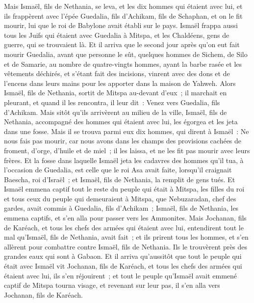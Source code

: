 \begin{multicols}{2}
Mais Ismaël, fils de Nethania, se leva, et les dix hommes qui étaient avec lui, et ils frappèrent avec l'épée Guedalia, fils d'Achikam, fils de Schaphan, et on le fit mourir, lui que le roi de Babylone avait établi sur le pays.
Ismaël frappa aussi tous les Juifs qui étaient avec Guedalia à Mitspa, et les Chaldéens, gens de guerre, qui se trouvaient là.
Et il arriva que le second jour après qu'on eut fait mourir Guedalia, avant que personne le sût,
quelques hommes de Sichem, de Silo et de Samarie, au nombre de quatre-vingts hommes, ayant la barbe rasée et les vêtements déchirés, et s'étant fait des incisions, vinrent avec des dons et de l'encens dans leurs mains pour les apporter dans la maison de Yahweh.
Alors Ismaël, fils de Nethania, sortit de Mitspa au-devant d'eux~; il marchait en pleurant, et quand il les rencontra, il leur dit~: Venez vers Guedalia, fils d'Achikam.
Mais sitôt qu'ils arrivèrent au milieu de la ville, Ismaël, fils de Nethania, accompagné des hommes qui étaient avec lui, les égorgea et les jeta dans une fosse.
Mais il se trouva parmi eux dix hommes, qui dirent à Ismaël~: Ne nous fais pas mourir, car nous avons dans les champs des provisions cachées de froment, d'orge, d'huile et de miel~; il les laissa, et ne les fit pas mourir avec leurs frères.
 Et la fosse dans laquelle Ismaël jeta les cadavres des hommes qu'il tua, à l'occasion de Guedalia, est celle que le roi Asa avait faite, lorsqu'il craignait Baescha, roi d'Israël~; et Ismaël, fils de Nethania, la remplit de gens tués.
Et Ismaël emmena captif tout le reste du peuple qui était à Mitspa, les filles du roi et tous ceux du peuple qui demeuraient à Mitspa, que Nebuzaradan, chef des gardes, avait commis à Guedalia, fils d'Achikam~; Ismaël, fils de Nethania, les emmena captifs, et s'en alla pour passer vers les Ammonites.
Mais Jochanan, fils de Karéach, et tous les chefs des armées qui étaient avec lui, entendirent tout le mal qu'Ismaël, fils de Nethania, avait fait~;
et ils prirent tous les hommes, et s'en allèrent pour combattre contre Ismaël, fils de Nethania. Ils le trouvèrent près des grandes eaux qui sont à Gabaon.
Et il arriva qu'aussitôt que tout le peuple qui était avec Ismaël vit Jochanan, fils de Karéach, et tous les chefs des armées qui étaient avec lui, ils s'en réjouirent~;
et tout le peuple qu'Ismaël avait emmené captif de Mitspa tourna visage, et revenant sur leur pas, il s'en alla vers Jochanan, fils de Karéach.

\end{multicols}

